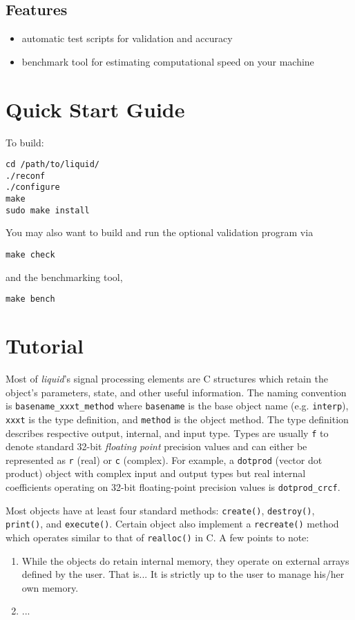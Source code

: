 \documentclass[11pt,twoside]{report}
\begin{document}
\subsection{Features}
\begin{itemize}
\item automatic test scripts for validation and accuracy
\item benchmark tool for estimating computational speed on your machine
\end{itemize}


\section{Quick Start Guide}
To build:
\begin{verbatim}
cd /path/to/liquid/
./reconf
./configure
make
sudo make install
\end{verbatim}
You may also want to build and run the optional validation program via
\begin{verbatim}
make check
\end{verbatim}
and the benchmarking tool,
\begin{verbatim}
make bench
\end{verbatim}

\section{Tutorial}
Most of {\it liquid}'s signal processing elements are C structures which
retain the object's parameters, state, and other useful information.
The naming convention is
{\tt basename\_xxxt\_method} where
{\tt basename} is the base object name (e.g. {\tt interp}),
{\tt xxxt} is the type definition, and
{\tt method} is the object method.
The type definition describes respective output, internal, and input type.
Types are usually {\tt f} to denote standard 32-bit {\it floating point}
precision values and can either be represented as {\tt r} (real) or {\tt c}
(complex).
For example, a {\tt dotprod} (vector dot product) object with complex input
and output types but real internal coefficients operating on 32-bit
floating-point precision values is {\tt dotprod\_crcf}.

Most objects have at least four standard methods:
{\tt create()},
{\tt destroy()},
{\tt print()},
and
{\tt execute()}.
Certain object also implement a {\tt recreate()} method which operates similar
to that of {\tt realloc()} in C.
A few points to note:
\begin{enumerate}
\item While the objects do retain internal memory, they operate on external
arrays defined by the user. That is... It is strictly up to the user to manage
his/her own memory.
\item ...
\end{enumerate}
\end{document}
